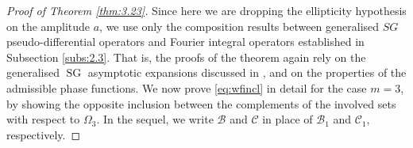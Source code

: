 \documentclass[12pt,a4paper,reqno]{amsart}
\numberwithin{equation}{section}
\numberwithin{thm}{section}
\theoremstyle{definition}
\theoremstyle{remark}
\begin{document}
\begin{proof}[Proof of Theorem \ref{thm:3.23}]
	Since here we are dropping the ellipticity hypothesis on the amplitude $a$, we use 
	only the composition results between generalised 
	$SG$ pseudo-differential operators and Fourier integral
	operators established in Subsection \ref{subs:2.3}. That is, the proofs of the
	theorem again rely on the generalised ${\operatorname{SG}}$ asymptotic expansions 
	discussed in \cite{CoTo}, and on the properties of the admissible phase functions. 
		We now prove \eqref{eq:wfincl} in detail for the case $m=3$, by showing the opposite inclusion
		between the complements of the involved sets with respect to $\Omega_3$. 
		In the sequel, we write ${{\mathcal B}}$ and ${{\mathcal C}}$ in place of ${{\mathcal B}}_1$ and ${{\mathcal C}}_1$, respectively.
					
	\medskip	
		

\end{proof}
\end{document}
